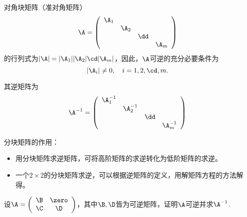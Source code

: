 \begin{frame}\ft{\secname}


\begin{dingyi}[可逆分块矩阵的逆矩阵]
  对角块矩阵（准对角矩阵）
  $$
  \A = \left(
    \begin{array}{cccc}
      \A_1&&&\\
          &\A_2&&\\
          &&\dd&\\
          &&&\A_m
    \end{array}
  \right)
  $$
  的行列式为$|\A|=|\A_1||\A_2|\cd|\A_m|$，因此，$\A$可逆的充分必要条件为
  $$
  |\A_i|\ne 0, \quad i=1,2,\cd, m.
  $$

  其逆矩阵为
  $$
  \A^{-1} = \left(
    \begin{array}{cccc}
      \A_1^{-1}&&&\\
               &\A_2^{-1}&&\\
               &&\dd&\\
               &&&\A_m^{-1}
    \end{array}
  \right)
  $$
\end{dingyi}
\end{frame}

\begin{frame}\ft{\secname}
分块矩阵的作用：
\begin{itemize}
\item   用分块矩阵求逆矩阵，可将高阶矩阵的求逆转化为低阶矩阵的求逆。
\item   一个$2\times 2$的分块矩阵求逆，可以根据逆矩阵的定义，用解矩阵方程的方法解得。
\end{itemize}
\end{frame}

\begin{frame}\ft{\secname}
\begin{li}
  设$\A=\left(
    \begin{array}{cc}
      \B&\zero\\
      \C&\D
    \end{array}
  \right)$，其中$\B,\D$皆为可逆矩阵，证明$\A$可逆并求$\A^{-1}$.
\end{li}
\end{frame}

